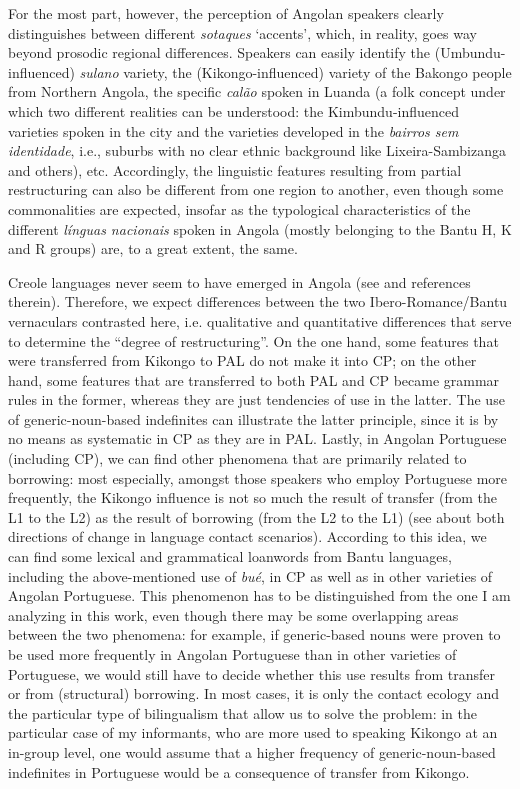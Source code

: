 \documentclass[output=paper,colorlinks,citecolor=brown]{langscibook}
\begin{document}
For the most part, however, the perception of Angolan speakers clearly distinguishes between different \textit{sotaques} ‘accents’, which, in reality, goes way beyond prosodic regional differences. Speakers can easily identify the (Umbundu-influenced) \textit{sulano} variety, the (Kikongo-influenced) variety of the Bakongo people from Northern Angola, the specific \textit{calão} spoken in Luanda (a folk concept under which two different realities can be understood: the Kimbundu-influenced varieties spoken in the city \citep[cf.][]{Mingas2000} and the varieties developed in the \textit{bairros sem identidade}, i.e., suburbs with no clear ethnic background like Lixeira-Sambizanga and others), etc. Accordingly, the linguistic features resulting from partial restructuring can also be different from one region to another, even though some commonalities are expected, insofar as the typological characteristics of the different \textit{línguas nacionais} spoken in Angola (mostly belonging to the Bantu H, K and R groups) are, to a great extent, the same.\largerpage

Creole languages never seem to have emerged in Angola (see \cite[][112--117]{GutiérrezMaté2020} and references therein). Therefore, we expect differences between the two Ibero\hyp Romance\slash Bantu vernaculars contrasted here, i.e. qualitative and quantitative differences that serve to determine the “degree of restructuring”. On the one hand, some features that were transferred from Kikongo to PAL do not make it into CP; on the other hand, some features that are transferred to both PAL and CP became grammar rules in the former, whereas they are just tendencies of use in the latter. The use of generic-noun-based indefinites can illustrate the latter principle, since it is by no means as systematic in CP as they are in PAL. Lastly, in Angolan Portuguese (including CP), we can find other phenomena that are primarily related to borrowing: most especially, amongst those speakers who employ Portuguese more frequently, the Kikongo influence is not so much the result of transfer (from the L1 to the L2) as the result of borrowing (from the L2 to the L1) (see \cite{ThomasonKaufman1988} about both directions of change in language contact scenarios). According to this idea, we can find some lexical and grammatical loanwords from Bantu languages, including the above-mentioned use of \textit{bué}, in CP as well as in other varieties of Angolan Portuguese. This phenomenon has to be distinguished from the one I am analyzing in this work, even though there may be some overlapping areas between the two phenomena: for example, if generic-based nouns were proven to be used more frequently in Angolan Portuguese than in other varieties of Portuguese, we would still have to decide whether this use results from transfer or from (structural) borrowing. In most cases, it is only the contact ecology and the particular type of bilingualism that allow us to solve the problem: in the particular case of my informants, who are more used to speaking Kikongo at an in-group level, one would assume that a higher frequency of generic-noun-based indefinites in Portuguese would be a consequence of transfer from Kikongo.
\end{document}

